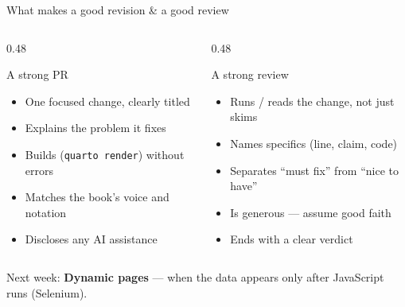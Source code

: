 \documentclass[9pt,aspectratio=169]{beamer}
\begin{document}
\begin{frame}{What makes a good revision \& a good review}
    \begin{columns}[T]
        \begin{column}{0.48\textwidth}
            \begin{block}{A strong PR}
                \begin{itemize}\small
                    \item One focused change, clearly titled
                    \item Explains the problem it fixes
                    \item Builds (\texttt{quarto render}) without errors
                    \item Matches the book's voice and notation
                    \item Discloses any AI assistance
                \end{itemize}
            \end{block}
        \end{column}
        \begin{column}{0.48\textwidth}
            \begin{block}{A strong review}
                \begin{itemize}\small
                    \item Runs / reads the change, not just skims
                    \item Names specifics (line, claim, code)
                    \item Separates ``must fix'' from ``nice to have''
                    \item Is generous --- assume good faith
                    \item Ends with a clear verdict
                \end{itemize}
            \end{block}
        \end{column}
    \end{columns}
    \vspace{0.5em}
    \centering\small Next week: \textbf{Dynamic pages} --- when the data appears only after JavaScript runs (Selenium).
\end{frame}
\end{document}
